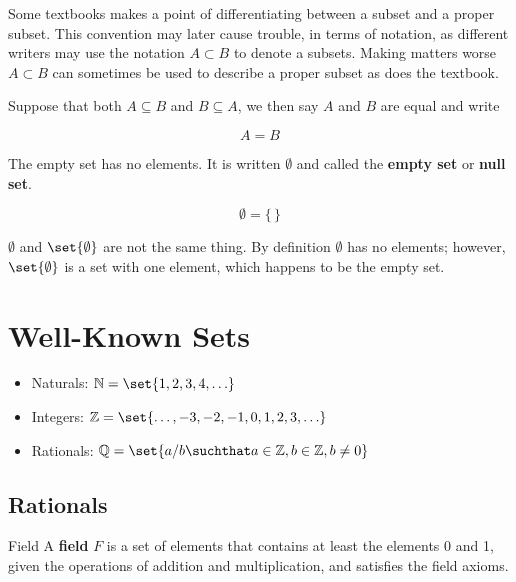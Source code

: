 \documentclass[20150903-160354-rs2.2-MarksMathNotebook.tex]{subfiles}
\begin{document}
\begin{remark}
Some textbooks makes a point of differentiating between a subset and a proper subset.  This convention may later cause trouble, in terms of notation, as different writers may use the notation $A \subset B$ to denote a subsets. Making matters worse $A \subset B$ can sometimes be used to describe a proper subset as does the textbook.
\end{remark}

\begin{definition}
Suppose that both $A \subseteq B$ and $B \subseteq A$, we then say $A$ and $B$ are equal and write

\[
A=B
\]
\end{definition}

\begin{definition}
The empty set has no elements.  It is written $\emptyset$ and called the \textbf{empty set} or \textbf{null set}.

\[
\emptyset = \{\,\}
\]
\end{definition}

\begin{remark}
$\emptyset$ and $\set{\emptyset}$ are not the same thing.  By definition $\emptyset$ has no elements; however, $\set{\emptyset}$ is a set with one element, which happens to be the empty set.
\end{remark}

\section{Well-Known Sets}

\begin{itemize}
    \item Naturals: $\mathbb{N}= \set{1, 2, 3, 4, \ldots }$
    \item Integers: $\mathbb{Z}= \set{\ldots, -3, -2, -1, 0, 1, 2, 3, \ldots }$
    \item Rationals: $\mathbb{Q}= \set{a/b \suchthat a \in \mathbb{Z}, b \in \mathbb{Z}, b \ne 0 } $
\end{itemize}

\subsection{Rationals}

\begin{definition}[Field]{Field}
A \textbf{field} $F$ is a set of elements that contains at least the elements 0 and 1, given the operations of addition and multiplication, and satisfies the field axioms.
\end{definition}
\end{document}

